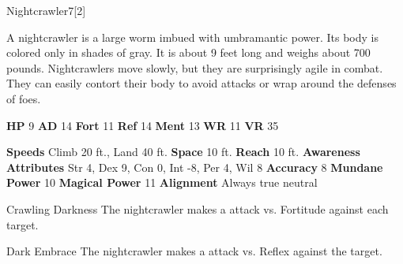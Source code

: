   \begin{monsection}{Nightcrawler}{7}[2]
    \vspace{-1em}\vspace{-1em}
    \vspace{0em}

    
      A nightcrawler is a large worm imbued with umbramantic power.
      Its body is colored only in shades of gray.
      It is about 9 feet long and weighs about 700 pounds.
      Nightcrawlers move slowly, but they are surprisingly agile in combat.
      They can easily contort their body to avoid attacks or wrap around the defenses of foes.
    
    

    \begin{spellcontent}
      \begin{spelltargetinginfo}
        \pari \textbf{HP} 9 \monsep
          \textbf{AD} 14 \monsep
          \textbf{Fort} 11 \monsep
          \textbf{Ref} 14 \monsep
          \textbf{Ment} 13
        \pari \textbf{WR} 11 \monsep
        \textbf{VR} 35
        
      \end{spelltargetinginfo}
    \end{spellcontent}
    \begin{monsterfooter}
      \pari \textbf{Speeds} Climb 20 ft., Land 40 ft. \monsep
        \textbf{Space} 10 ft. \monsep
        \textbf{Reach} 10 ft.
      \pari \textbf{Awareness} 
      \pari \textbf{Attributes}
        Str 4, Dex 9,
        Con 0, Int -8,
        Per 4, Wil 8
      \pari \textbf{Accuracy} 8 \monsep
        \textbf{Mundane Power} 10 \monsep
      \textbf{Magical Power} 11
      \pari \textbf{Alignment} Always true neutral
    \end{monsterfooter}
  \end{monsection}
  \begin{freeability}{Crawling Darkness}
       The nightcrawler makes a  attack
        vs. Fortitude against each target.
    \end{freeability}
  

    \begin{freeability}{Dark Embrace}
       The nightcrawler makes a  attack
        vs. Reflex against the target.
    \end{freeability}
  
